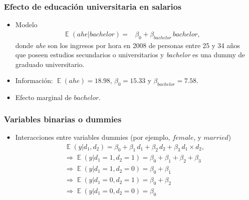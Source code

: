 \documentclass[t, compress, spanish, aspectratio=169]{beamer}
\DeclareMathOperator{\E}{\mathbb{E}}
\begin{document}
    
    \begin{frame}
    		\frametitle{Efecto de educaci\'on universitaria en salarios}
    		\begin{itemize}
    			\item  Modelo
    			\begin{align*}
    				\E(ahe|bachelor) =& \beta_0 +\beta_{bachelor} \,bachelor ,
    			\end{align*}
    			donde \emph{ahe} son los ingresos por hora en 2008 de personas entre 25 y 34 a\~nos que poseen estudios secundarios o universitarios y \emph{bachelor} es una dummy de graduado universitario.
    			\item Informaci\'on: $\E(ahe)=18.98$, $\beta_{0}=15.33$ y $\beta_{bachelor}=7.58$.
    			\item Efecto marginal de $bachelor$.
    		\end{itemize}
    \end{frame}    
%      
    
    
    \begin{frame}
        \frametitle{Variables binarias o dummies}
        \begin{itemize}
            \item  Interacciones entre variables dummies (por ejemplo, $female$, y $married$)
            \begin{align*}
            		&\E(y|d_1, d_2)=\beta_0 + \beta_1 \, d_1+\beta_2 \, d_2+\beta_3 \, d_1 \times d_2, \\
            		&\Rightarrow \E(y|d_1\!=\!1,d_2\!=\!1)=\beta_0+\beta_1+\beta_2+\beta_3\\
            		&\Rightarrow \E(y|d_1\!=\!1,d_2\!=\!0)=\beta_0+\beta_1\\
            		&\Rightarrow \E(y|d_1\!=\!0,d_2\!=\!1)=\beta_0+\beta_2\\
            		&\Rightarrow \E(y|d_1\!=\!0,d_2\!=\!0)=\beta_0
            \end{align*}
        \end{itemize}
    \end{frame}
\end{document}
